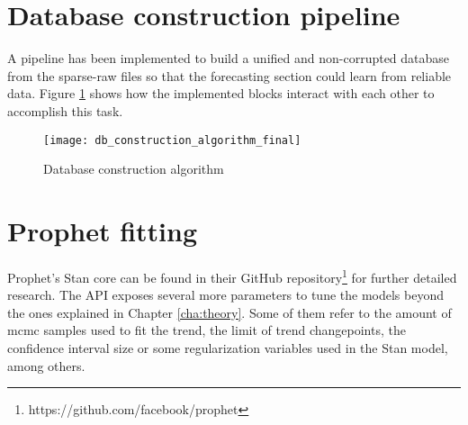% 				
% 				
% 				
% 				


\section{Database construction pipeline}


A pipeline has been implemented to build a unified and non-corrupted database from the sparse-raw files so that the forecasting section could learn from reliable data. Figure \ref{fig:db_construction_algorithm} shows how the implemented blocks interact with each other to accomplish this task.

\begin{figure}[H]
	\centering
	\texttt{[image: db\_construction\_algorithm\_final]}
	\caption{Database construction algorithm}
	\label{fig:db_construction_algorithm}
\end{figure}







\section{Prophet fitting}

Prophet's Stan core \cite{carpenter2017stan} can be found in their GitHub repository\footnote{https://github.com/facebook/prophet} for further detailed research. The API exposes several more parameters to tune the models beyond the ones explained in Chapter \ref{cha:theory}. Some of them refer to the amount of \ac{mcmc} samples used to fit the trend, the limit of trend changepoints, the confidence interval size or some regularization variables used in the Stan model, among others.

